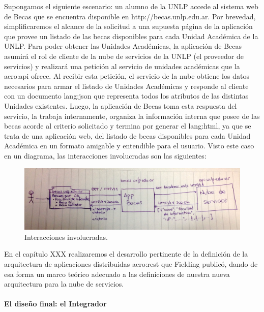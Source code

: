 Supongamos el siguiente escenario: un alumno de la UNLP accede al sistema web de Becas que se encuentra disponible en http://becas.unlp.edu.ar. Por brevedad, simplificaremos el alcance de la solicitud a una supuesta página de la aplicación que provee un listado de las becas disponibles para cada Unidad Académica de la UNLP. Para poder obtener las Unidades Académicas, la aplicación de Becas asumirá el rol de cliente de la nube de servicios de la UNLP (el proveedor de servicios) y realizará una petición al servicio de unidades académicas que la \gls{acro:api} ofrece. Al recibir esta petición, el servicio de la nube obtiene los datos necesarios para armar el listado de Unidades Académicas y responde al cliente con un documento \gls{lang:json} que representa todos los atributos de las distintas Unidades existentes. Luego, la aplicación de Becas toma esta respuesta del servicio, la trabaja internamente, organiza la información interna que posee de las becas acorde al criterio solicitado y termina por generar el \gls{lang:html}, ya que se trata de una aplicación web, del listado de becas disponibles para cada Unidad Académica en un formato amigable y entendible para el usuario. Visto este caso en un diagrama, las interacciones involucradas son las siguientes:

\begin{figure}
  \includegraphics[width=\linewidth]{src/images/01-capitulo-1/ejemplo-rest-becas.jpg}
  \caption{Interacciones involucradas.}
  \label{fig:ejemplo-rest-becas}
\end{figure}

En el capítulo XXX realizaremos el desarrollo pertinente de la definición de la arquitectura de aplicaciones distribuidas \gls{acro:rest} que Fielding publicó, dando de esa forma un marco teórico adecuado a las definiciones de nuestra nueva arquitectura para la nube de servicios.


\paragraph{El diseño final: el Integrador}

